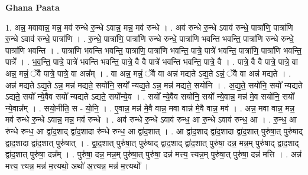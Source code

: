 \documentclass[17pt]{extarticle}
\begin{document}
\textbf{Ghana Paata } \newline

1. अन्न॒ मवावान्न॒ मन्न॒ मव॑ रुन्धे रु॒न्धे ऽवान्न॒ मन्न॒ मव॑ रुन्धे । . अव॑ रुन्धे रु॒न्धे ऽवाव॑ रुन्धे॒ पात्रा॑णि॒ पात्रा॑णि रु॒न्धे ऽवाव॑ रुन्धे॒ पात्रा॑णि । . रु॒न्धे॒ पात्रा॑णि॒ पात्रा॑णि रुन्धे रुन्धे॒ पात्रा॑णि भवन्ति भवन्ति॒ पात्रा॑णि रुन्धे रुन्धे॒ पात्रा॑णि भवन्ति । . पात्रा॑णि भवन्ति भवन्ति॒ पात्रा॑णि॒ पात्रा॑णि भवन्ति॒ पात्रे॒ पात्रे॑ भवन्ति॒ पात्रा॑णि॒ पात्रा॑णि भवन्ति॒ पात्रे᳚ । . भ॒व॒न्ति॒ पात्रे॒ पात्रे॑ भवन्ति भवन्ति॒ पात्रे॒ वै वै पात्रे॑ भवन्ति भवन्ति॒ पात्रे॒ वै । . पात्रे॒ वै वै पात्रे॒ पात्रे॒ वा अन्न॒ मन्नं॒ ॅवै पात्रे॒ पात्रे॒ वा अन्न᳚म् । . वा अन्न॒ मन्नं॒ ॅवै वा अन्न॑ मद्यते ऽद्य॒ते ऽन्नं॒ ॅवै वा अन्न॑ मद्यते । . अन्न॑ मद्यते ऽद्य॒ते ऽन्न॒ मन्न॑ मद्यते॒ सयो॑नि॒ सयो᳚ न्यद्य॒ते ऽन्न॒ मन्न॑ मद्यते॒ सयो॑नि । . अ॒द्य॒ते॒ सयो॑नि॒ सयो᳚ न्यद्यते ऽद्यते॒ सयो᳚ न्ये॒वैव सयो᳚ न्यद्यते ऽद्यते॒ सयो᳚न्ये॒व । . सयो᳚ न्ये॒वैव सयो॑नि॒ सयो᳚ न्ये॒वान्न॒ मन्न॑ मे॒व सयो॑नि॒ सयो᳚ न्ये॒वान्न᳚म् । . सयो॒नीति॒ स - यो॒नि॒ । . ए॒वान्न॒ मन्न॑ मे॒वै वान्न॒ मवा वान्न॑ मे॒वै वान्न॒ मव॑ । . अन्न॒ मवा वान्न॒ मन्न॒ मव॑ रुन्धे रु॒न्धे ऽवान्न॒ मन्न॒ मव॑ रुन्धे । . अव॑ रुन्धे रु॒न्धे ऽवाव॑ रुन्ध॒ आ रु॒न्धे ऽवाव॑ रुन्ध॒ आ । . रु॒न्ध॒ आ रु॑न्धे रुन्ध॒ आ द्वा॑द॒शाद् द्वा॑द॒शादा रु॑न्धे रुन्ध॒ आ द्वा॑द॒शात् । . आ द्वा॑द॒शाद् द्वा॑द॒शादा द्वा॑द॒शात् पुरु॑षा॒त् पुरु॑षाद् द्वाद॒शादा द्वा॑द॒शात् पुरु॑षात् । . द्वा॒द॒शात् पुरु॑षा॒त् पुरु॑षाद् द्वाद॒शाद् द्वा॑द॒शात् पुरु॑षा॒ दन्न॒ मन्न॒म् पुरु॑षाद् द्वाद॒शाद् द्वा॑द॒शात् पुरु॑षा॒ दन्न᳚म् । . पुरु॑षा॒ दन्न॒ मन्न॒म् पुरु॑षा॒त् पुरु॑षा॒ दन्न॑ मत्त्य॒ त्त्यन्न॒म् पुरु॑षा॒त् पुरु॑षा॒ दन्न॑ मत्ति । . अन्न॑ मत्त्य॒ त्त्यन्न॒ मन्न॑ म॒त्त्यथो॒ अथो॑ अ॒त्त्यन्न॒ मन्न॑ म॒त्त्यथो᳚ । \newline
\end{document}
